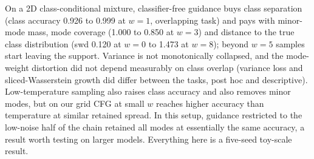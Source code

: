 On a 2D class-conditional mixture, classifier-free guidance buys class separation (class accuracy 0.926 to 0.999 at $w=1$, overlapping task) and pays with minor-mode mass, mode coverage (1.000 to 0.850 at $w=3$) and distance to the true class distribution (swd 0.120 at $w=0$ to 1.473 at $w=8$); beyond $w=5$ samples start leaving the support. Variance is not monotonically collapsed, and the mode-weight distortion did not depend measurably on class overlap (variance loss and sliced-Wasserstein growth did differ between the tasks, post hoc and descriptive). Low-temperature sampling also raises class accuracy and also removes minor modes, but on our grid CFG at small $w$ reaches higher accuracy than temperature at similar retained spread. In this setup, guidance restricted to the low-noise half of the chain retained all modes at essentially the same accuracy, a result worth testing on larger models. Everything here is a five-seed toy-scale result.
